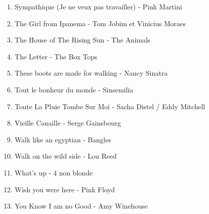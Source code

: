 \documentclass[12pt]{extarticle}
\begin{document}
\begin{multicols}{2}
\begin{enumerate}[nolistsep]
\item   Sympathique (Je ne veux pas travailler)
        - Pink Martini
\item   The Girl from Ipanema
        - Tom Jobim et Vinicius Moraes
\item   The House of The Rising Sun
        - The Animals
\item   The Letter
        - The Box Tops
\item   These boots are made for walking
        - Nancy Sinatra
\item   Tout le bonheur du monde
        - Sinsemilia
\item   Toute La Pluie Tombe Sur Moi
        - Sacha Distel / Eddy Mitchell
\item   Vieille Canaille
        - Serge Gainsbourg
\item   Walk like an egyptian
        - Bangles
\item   Walk on the wild side
        - Lou Reed
\item   What's up
        - 4 non blonde
\item   Wish you were here
        - Pink Floyd
\item   You Know I am no Good
        - Amy Winehouse
\end{enumerate}
\end{multicols}
\end{document}
